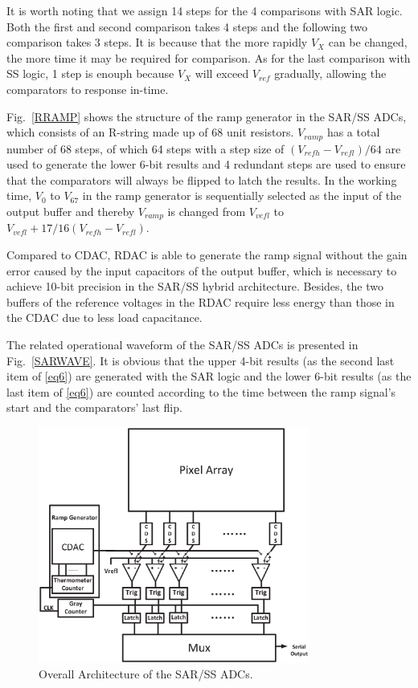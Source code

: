 It is worth noting that we assign 14 steps for the 4 comparisons with SAR logic. Both the first and second comparison takes 4 steps and the following two comparison takes 3 steps. It is because that the more rapidly $V_{X}$ can be changed, the more time it may be required for comparison. As for the last comparison with SS logic, 1 step is enouph because $V_{X}$ will exceed $V_{ref}$ gradually, allowing the comparators to response in-time.

Fig.~\ref{RRAMP} shows the structure of the ramp generator in the SAR/SS ADCs, which consists of an R-string made up of 68 unit resistors. $V_{ramp}$ has a total number of 68 steps,
of which 64 steps with a step size of $(V_{refh}-V_{refl})/64$ are used to generate the lower 6-bit results and 4 redundant steps are used to ensure that the comparators 
will always be flipped to latch the results. In the working time, $V_{0}$ to $V_{67}$ in the ramp generator is sequentially selected as the input of the output buffer and thereby 
$V_{ramp}$ is changed from $V_{vefl}$ to $V_{vefl}+17/16(V_{refh}-V_{refl})$.

Compared to CDAC, RDAC is able to generate the ramp signal without the gain error caused by the input capacitors of the output buffer, 
which is necessary to achieve 10-bit precision in the SAR/SS hybrid architecture.
Besides, the two buffers of the reference voltages in the RDAC require less energy than those in the CDAC due to less load capacitance.  

The related operational waveform of the SAR/SS ADCs is presented in Fig.~\ref{SARWAVE}. It is obvious that the upper 4-bit results (as the second last item of \eqref{eq6}) are generated 
with the SAR logic and the lower 6-bit results (as the last item of \eqref{eq6}) are counted according to the time between the ramp signal’s start and the comparators’ last flip.

\begin{figure}[htbp]
	\centerline{\includegraphics[width=3.5in]{./Figures/SARADC.eps}}
	\caption{Overall Architecture of the SAR/SS ADCs.}
	\label{SARADC}
\end{figure} 

